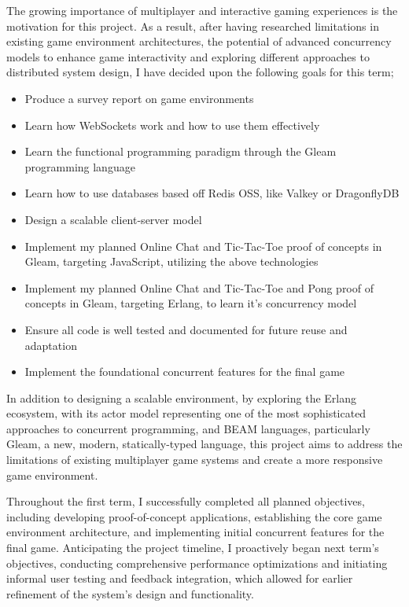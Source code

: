 \documentclass[]{interim}
\begin{document}
\newpage

The growing importance of multiplayer and interactive gaming experiences
is the motivation for this project. As a result, after having researched limitations
in existing game environment architectures, the potential of advanced
concurrency models to enhance game interactivity and exploring different
approaches to distributed system design, I have decided upon the following
goals for this term;

\begin{itemize}
  \item Produce a survey report on game environments
  \item Learn how WebSockets work and how to use them effectively
  \item Learn the functional programming paradigm through the Gleam programming language
  \item Learn how to use databases based off Redis OSS, like Valkey or DragonflyDB
  \item Design a scalable client-server model
  \item Implement my planned Online Chat and Tic-Tac-Toe proof of concepts in Gleam, targeting JavaScript, utilizing the above technologies
  \item Implement my planned Online Chat and Tic-Tac-Toe and Pong proof of concepts in Gleam, targeting Erlang, to learn it's concurrency model
  \item Ensure all code is well tested and documented for future reuse and adaptation
  \item Implement the foundational concurrent features for the final game
\end{itemize}

In addition to designing a scalable environment,
by exploring the Erlang ecosystem, with its actor model representing one of the
most sophisticated approaches to concurrent programming, and
BEAM languages, particularly Gleam, a new, modern, statically-typed language,
this project aims to address the limitations of existing multiplayer
game systems and create a more responsive game environment.

Throughout the first term, I successfully completed all planned objectives,
including developing proof-of-concept applications,
establishing the core game environment architecture, and implementing initial
concurrent features for the final game. Anticipating the project timeline,
I proactively began next term's objectives, conducting comprehensive performance
optimizations and initiating informal user testing and feedback integration,
which allowed for earlier refinement of the system's design and functionality.
\end{document}
